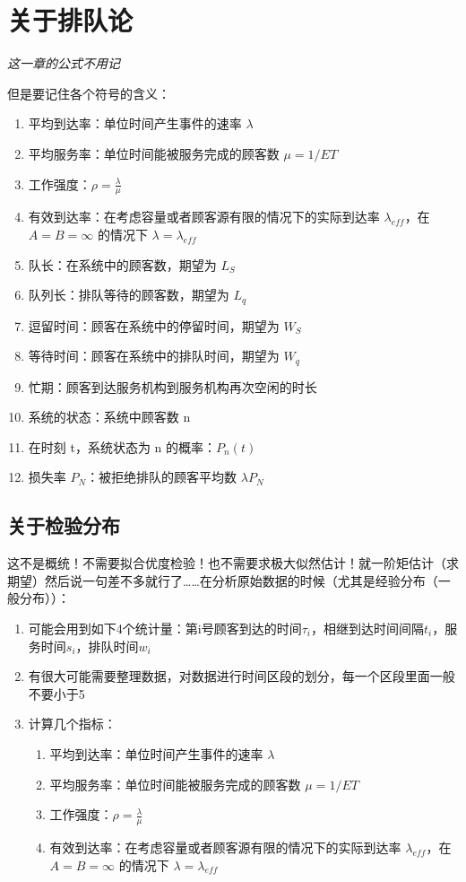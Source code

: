 \documentclass[]{report}
\begin{document}
	\section{关于排队论}
		\indent\textit{这一章的公式不用记}\par
		但是要记住各个符号的含义：
		\begin{enumerate}
			\item 平均到达率：单位时间产生事件的速率 $\lambda$
			\item 平均服务率：单位时间能被服务完成的顾客数 $\mu=1/ET$
			\item 工作强度：$\rho=\frac{\lambda}{\mu}$
			\item 有效到达率：在考虑容量或者顾客源有限的情况下的实际到达率 $\lambda_{e\!f\!f}$，在 $A=B=∞$ 的情况下 $\lambda=\lambda_{e\!f\!f}$
			\item 队长：在系统中的顾客数，期望为 $L_S$
			\item 队列长：排队等待的顾客数，期望为 $L_q$
			\item 逗留时间：顾客在系统中的停留时间，期望为 $W_S$
			\item 等待时间：顾客在系统中的排队时间，期望为 $W_q$
			\item 忙期：顾客到达服务机构到服务机构再次空闲的时长
			\item 系统的状态：系统中顾客数 n
			\item 在时刻 t，系统状态为 n 的概率：$P_n(t)$
			\item 损失率 $P_N$：被拒绝排队的顾客平均数 $\lambda P_N$
		\end{enumerate}
		\subsection{关于检验分布}
		这不是概统！不需要拟合优度检验！也不需要求极大似然估计！就一阶矩估计（求期望）然后说一句差不多就行了……在分析原始数据的时候（尤其是经验分布（一般分布））：
		\begin{enumerate}
			\item 可能会用到如下4个统计量：第i号顾客到达的时间$\tau_i$，相继到达时间间隔$t_i$，服务时间$s_i$，排队时间$w_i$
			\item 有很大可能需要整理数据，对数据进行时间区段的划分，每一个区段里面一般不要小于5
			\item 计算几个指标：
			\begin{enumerate}
				\item 平均到达率：单位时间产生事件的速率 $\lambda$
				\item 平均服务率：单位时间能被服务完成的顾客数 $\mu=1/ET$
				\item 工作强度：$\rho=\frac{\lambda}{\mu}$
				\item 有效到达率：在考虑容量或者顾客源有限的情况下的实际到达率 $\lambda_{e\!f\!f}$，在 $A=B=\infty$ 的情况下 $\lambda=\lambda_{e\!f\!f}$
			\end{enumerate}
		\end{enumerate}
\end{document}
